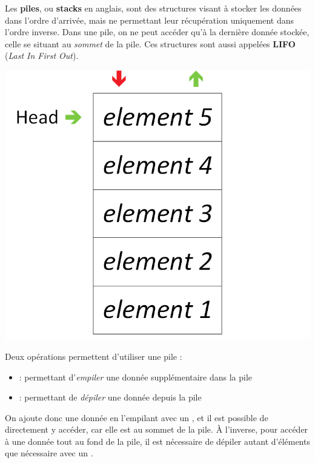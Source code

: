 \documentclass[11pt,a4paper]{article}
\begin{document}
\bigskip

Les \textbf{piles}, ou \textbf{stacks} en anglais, sont des structures visant à stocker les données dans l'ordre d'arrivée, mais ne permettant leur récupération uniquement dans l'ordre inverse.
Dans une pile, on ne peut accéder qu'à la dernière donnée stockée, celle se situant au \textit{sommet} de la pile.
Ces structures sont aussi appelées \textbf{LIFO} (\textit{Last In First Out}).\\

\begin{center}
\includegraphics[scale=0.75]{img/piles/Piles_1_Structure_Generale_centered.png}
\end{center}

\smallskip

Deux opérations permettent d'utiliser une pile :
\begin{itemize}
\item {} : permettant d'\textit{empiler} une donnée supplémentaire dans la pile
\item {} : permettant de \textit{dépiler} une donnée depuis la pile
\end{itemize}
On ajoute donc une donnée en l'empilant avec un , et il est possible de directement y accéder, car elle est au sommet de la pile.
À l'inverse, pour accéder à une donnée tout au fond de la pile, il est nécessaire de dépiler autant d'éléments que nécessaire avec un .\\
\end{document}
